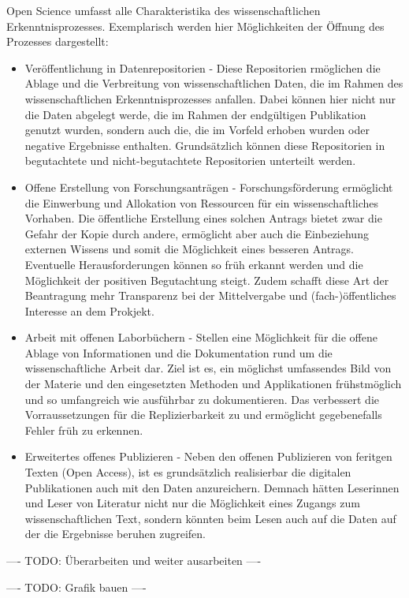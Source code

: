 Open Science umfasst alle Charakteristika des wissenschaftlichen Erkenntnisprozesses. Exemplarisch werden hier Möglichkeiten der Öffnung des Prozesses dargestellt:
\begin{itemize}
\item Veröffentlichung in Datenrepositorien - Diese Repositorien rmöglichen die Ablage und die Verbreitung von wissenschaftlichen Daten, die im Rahmen des wissenschaftlichen Erkenntnisprozesses anfallen. Dabei können hier nicht nur die Daten abgelegt werde, die im Rahmen der endgültigen Publikation genutzt wurden, sondern auch die, die im Vorfeld erhoben wurden oder negative Ergebnisse enthalten. Grundsätzlich können diese Repositorien in begutachtete und nicht-begutachtete Repositorien unterteilt werden.
\item Offene Erstellung von Forschungsanträgen - Forschungsförderung ermöglicht die Einwerbung und Allokation von Ressourcen für ein wissenschaftliches Vorhaben. Die öffentliche Erstellung eines solchen Antrags bietet zwar die Gefahr der Kopie durch andere, ermöglicht aber auch die Einbeziehung externen Wissens und somit die Möglichkeit eines besseren Antrags. Eventuelle Herausforderungen können so früh erkannt werden und die Möglichkeit der positiven Begutachtung steigt. Zudem schafft diese Art der Beantragung mehr Transparenz bei der Mittelvergabe und (fach-)öffentliches Interesse an dem Prokjekt.
\item Arbeit mit offenen Laborbüchern - Stellen eine Möglichkeit für die offene Ablage von Informationen und die Dokumentation rund um die wissenschaftliche Arbeit dar. Ziel ist es, ein möglichst umfassendes Bild von der Materie und den eingesetzten Methoden und Applikationen frühstmöglich und so umfangreich wie ausführbar zu dokumentieren. Das verbessert die Vorraussetzungen für die Replizierbarkeit zu und ermöglicht gegebenefalls Fehler früh zu erkennen.
\item Erweitertes offenes Publizieren - Neben den offenen Publizieren von feritgen Texten (Open Access), ist es grundsätzlich realisierbar die digitalen Publikationen auch mit den Daten anzureichern. Demnach hätten Leserinnen und Leser von Literatur nicht nur die Möglichkeit eines Zugangs zum wissenschaftlichen Text, sondern könnten beim Lesen auch auf die Daten auf der die Ergebnisse beruhen zugreifen.
\end{itemize}

---- TODO: Überarbeiten und weiter ausarbeiten ----

---- TODO: Grafik bauen ----

